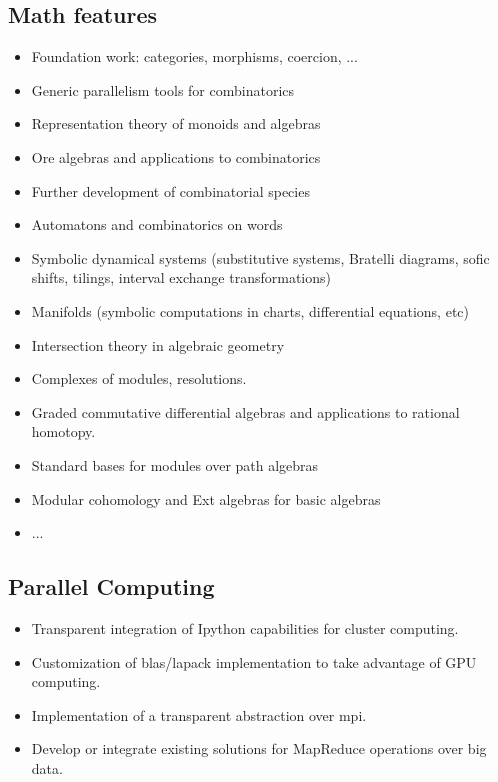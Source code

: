\subsection{Math features}

\begin{itemize}
\item Foundation work: categories, morphisms, coercion, ...
\item Generic parallelism tools for combinatorics
\item Representation theory of monoids and algebras
\item Ore algebras and applications to combinatorics
\item Further development of combinatorial species
\item Automatons and combinatorics on words
\item Symbolic dynamical systems (substitutive systems, Bratelli diagrams,
  sofic shifts, tilings, interval exchange transformations)
\item Manifolds (symbolic computations in charts, differential equations, etc)
\item Intersection theory in algebraic geometry
\item Complexes of modules, resolutions.
\item Graded commutative differential algebras and applications to rational homotopy.
\item Standard bases for modules over path algebras
\item Modular cohomology and Ext algebras for basic algebras
\item ...
\end{itemize}

\subsection{Parallel Computing}

\begin{itemize}
 \item Transparent integration of Ipython capabilities for cluster computing.
 \item Customization of blas/lapack implementation to take advantage of GPU computing.
 \item Implementation of a transparent abstraction over mpi.
 \item Develop or integrate existing solutions for MapReduce operations over big data.
\end{itemize}

